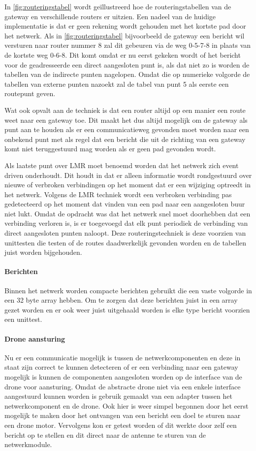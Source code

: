\documentclass[a4paper, 11pt, oneside]{report}
\begin{document}
In \autoref{fig:routeringstabel} wordt geïllustreerd hoe de routeringstabellen van de gateway en verschillende routers er uitzien.
Een nadeel van de huidige implementatie is dat er geen rekening wordt gehouden met het kortste pad door het netwerk.
Als in \autoref{fig:routeringstabel} bijvoorbeeld de gateway een bericht wil versturen naar router nummer 8 zal dit gebeuren via de weg 0-5-7-8 in plaats van de kortste weg 0-6-8. Dit komt omdat er nu eerst gekeken wordt of het bericht voor de geadresseerde een direct aangesloten punt is, als dat niet zo is worden de tabellen van de indirecte punten nagelopen. Omdat die op numerieke volgorde de tabellen van externe punten nazoekt zal de tabel van punt 5 als eerste een routepunt geven.

Wat ook opvalt aan de techniek is dat een router altijd op een manier een route weet naar een gateway toe. Dit maakt het dus altijd mogelijk om de gateway als punt aan te houden als er een communicatieweg gevonden moet worden naar een onbekend punt met als regel dat een bericht die uit de richting van een gateway komt niet teruggestuurd mag worden als er geen pad gevonden wordt.

Als laatste punt over LMR moet benoemd worden dat het netwerk zich event driven onderhoudt.
Dit houdt in dat er alleen informatie wordt rondgestuurd over nieuwe of verbroken verbindingen op het moment dat er een wijziging optreedt in het netwerk. 
Volgens de LMR techniek wordt een verbroken verbinding pas gedetecteerd op het moment dat vinden van een pad naar een aangesloten buur niet lukt.
Omdat de opdracht was dat het netwerk snel moet doorhebben dat een verbinding verloren is, is er toegevoegd dat elk punt periodiek de verbinding van direct aangesloten punten naloopt. 
Deze routeringstechniek is deze voorzien van unittesten die testen of de routes daadwerkelijk gevonden worden en de tabellen juist worden bijgehouden.

\paragraph{Berichten}
Binnen het netwerk worden compacte berichten gebruikt die een vaste volgorde in een 32 byte array hebben.
Om te zorgen dat deze berichten juist in een array gezet worden en er ook weer juist uitgehaald worden is elke type bericht voorzien een unittest.

\paragraph{Drone aansturing}
Nu er een communicatie mogelijk is tussen de netwerkcomponenten en deze in staat zijn correct te kunnen detecteren of er een verbinding naar een gateway mogelijk is kunnen de componenten aangesloten worden op de interface van de drone voor aansturing.
Omdat de abstracte drone niet via een enkele interface aangestuurd kunnen worden is gebruik gemaakt van een adapter tussen het netwerkcomponent en de drone. 
Ook hier is weer simpel begonnen door het eerst mogelijk te maken door het ontvangen van een bericht een doel te sturen naar een drone motor. Vervolgens kon er getest worden of dit werkte door zelf een bericht op te stellen en dit direct naar de antenne te sturen van de netwerkmodule.
\end{document}
